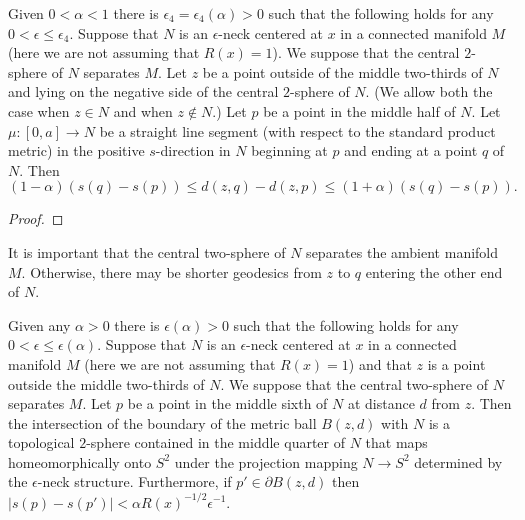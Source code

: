 \begin{lemma}
\label{lem:neck-distance-comparison-external-point}
\label{neckdistcomp}

Given $0<\alpha<1$ there is $\epsilon_4=\epsilon_4(\alpha)>0$ such
that the following holds for any $0<\epsilon\le \epsilon_4$. Suppose
that $N$ is an $\epsilon$-neck centered at $x$ in a connected
manifold $M$ (here we are not assuming that $R(x)=1$). We suppose
that the central $2$-sphere of $N$ separates $M$. Let $z$ be a point
outside of  the middle two-thirds of $N$ and lying on the negative
side of the central $2$-sphere of $N$. (We allow both the case when
$z\in N$ and when $z\not\in N$.) Let $p$ be a point in the middle
half of $N$. Let $\mu\colon [0,a]\to N$ be a straight line segment
(with respect to the standard product metric) in the positive
$s$-direction in $N$ beginning at $p$ and ending at a point $q$ of
$N$. Then
$$(1-\alpha)(s(q)-s(p))\le d(z,q)-d(z,p)\le (1+\alpha)(s(q)-s(p)).$$
\end{lemma}


\begin{proof}
\sketch
\end{proof}



 It is important that the central two-sphere of
$N$ separates the ambient manifold $M$. Otherwise, there may be
shorter geodesics from $z$ to $q$ entering the other end of $N$.

\begin{lemma}
\label{lem:metric-sphere-meets-neck-topologically}
\label{topiso}

Given any $\alpha>0$  there is $\epsilon(\alpha)>0$ such that  the
following holds for any $0<\epsilon\le \epsilon(\alpha)$. Suppose
that $N$ is an $\epsilon$-neck centered at $x$ in a connected
manifold $M$ (here we are not assuming that $R(x)=1$) and that $z$
is a point outside the middle two-thirds of $N$. We suppose that the
central two-sphere of $N$ separates $M$. Let $p$ be a point in the
middle sixth of $N$ at distance $d$ from $z$. Then the intersection
of the boundary of the metric ball $B(z,d)$ with $N$ is a
topological $2$-sphere contained in the middle quarter of $N$ that
maps homeomorphically onto $S^2$ under the projection mapping $N\to
S^2$ determined by the $\epsilon$-neck structure. Furthermore, if
$p'\in \partial B(z,d)$ then $|s(p)-s(p')|<\alpha
R(x)^{-1/2}\epsilon^{-1}$.
\end{lemma}

